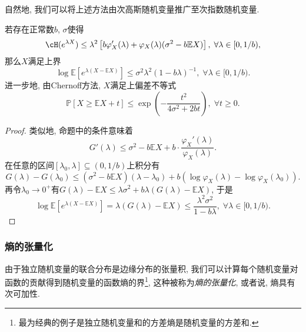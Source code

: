 自然地, 我们可以将上述方法由次高斯随机变量推广至次指数随机变量. 
\begin{proposition}[Bernstein熵的界]\label{thm:BernsteinEntropyBd}
	若存在正常数$b$, $\sigma$使得
	\begin{equation*}
		\cH(e^{\lambda X}) 
		\leq \lambda^2 \left[ b \varphi_X'(\lambda) + \varphi_X(\lambda)(\sigma^2 - b \mathbb{E}X) \right],\;
		\forall \lambda \in [0, 1/b), 
	\end{equation*}
	那么$X$满足上界
	\begin{equation*}
		\log \mathbb{E}\left[ e^{\lambda(X - \mathbb{E}X)}\right] 
		\leq \sigma^2 \lambda^2 (1 - b \lambda)^{-1},\; 
		\forall \lambda \in [0, 1/b). 
	\end{equation*}
	进一步地, 由Chernoff方法, $X$满足上偏差不等式
	\begin{equation*}
		\mathbb{P}[X \geq \mathbb{E}X + t] 
		\leq \exp \left(- \frac{t^2}{4 \sigma^2 + 2b t} \right),\;
		\forall t \geq 0. 
	\end{equation*}
\end{proposition}
\begin{proof}
	类似地, 命题中的条件意味着
	\begin{equation*}
		G'(\lambda) 
		\leq \sigma^2 - b \mathbb{E}X + b \cdot \frac{\varphi_X'(\lambda)}{\varphi_X(\lambda)}. 
	\end{equation*}
	在任意的区间$[\lambda_0, \lambda] \subseteq (0, 1/b)$上积分有
	\begin{equation*}
		G(\lambda) - G(\lambda_0) 
		\leq (\sigma^2 - b \mathbb{E}X)(\lambda - \lambda_0) + b(\log \varphi_X(\lambda) - \log \varphi_X(\lambda_0)). 
	\end{equation*}
	再令$\lambda_0 \to 0^+$有$G(\lambda) - \mathbb{E}X \leq \lambda \sigma^2 + b \lambda (G(\lambda) - \mathbb{E}X)$, 于是
	\begin{equation*}
		\log \mathbb{E}\left[e^{\lambda(X - \mathbb{E}X)}\right]
		= \lambda(G(\lambda) - \mathbb{E}X)
		\leq \frac{\lambda^2 \sigma^2}{1 - b \lambda} ,\; 
		\forall \lambda \in [0, 1/b). 
	\end{equation*}
\end{proof}

\subsubsection{熵的张量化}

由于独立随机变量的联合分布是边缘分布的张量积, 我们可以计算每个随机变量对函数的贡献得到随机变量的函数熵的界\footnote{最为经典的例子是独立随机变量和的方差熵是随机变量的方差和.}, 这种被称为\emph{熵的张量化}, 或者说, 熵具有次可加性. 


